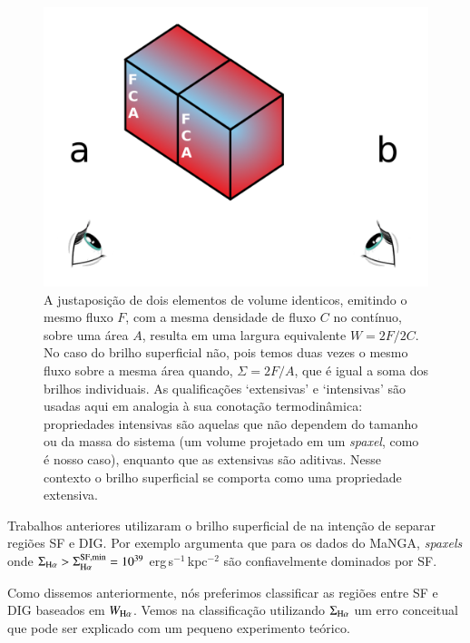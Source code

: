 \begin{figure}
\includegraphics[scale=0.6]{figuras/cubo_com_fundo.pdf}
\caption[Intensive $\times$ extensive]
{A justaposição de dois elementos de volume identicos, emitindo o mesmo fluxo $F$, com a mesma densidade de fluxo $C$ no contínuo, sobre uma área $A$, resulta em uma largura equivalente $W = 2F/2C$. No caso do brilho superficial não, pois temos duas vezes o mesmo fluxo sobre a mesma área quando, $\Sigma = 2F/A$, que é igual a soma dos brilhos individuais. As qualificações `extensivas' e `intensivas' são usadas aqui em analogia à sua conotação termodinâmica: propriedades intensivas são aquelas que não dependem do tamanho ou da massa do sistema (um volume projetado em um {\em spaxel}, como é nosso caso), enquanto que as extensivas são aditivas. Nesse contexto o brilho superficial se comporta como uma propriedade extensiva.}
 \label{fig:intensive_vs_extensive}
\end{figure}

Trabalhos anteriores utilizaram o brilho superficial de \Ha na intenção de separar regiões SF e DIG. Por exemplo \citet{Zhang.etal.2017a} argumenta que para os dados do MaNGA, {\em spaxels} onde $\Sigma_{\Ha} > \Sigma_{\Ha}^{\rm SF,min} = 10^{39}$ erg$\,$s$^{-1}\,$kpc$^{-2}$ são confiavelmente dominados por SF.

Como dissemos anteriormente, nós preferimos classificar as regiões entre SF e DIG baseados em $W_{\Ha}$. Vemos na classificação utilizando $\Sigma_{\Ha}$ um erro conceitual que pode ser explicado com um pequeno experimento teórico.

